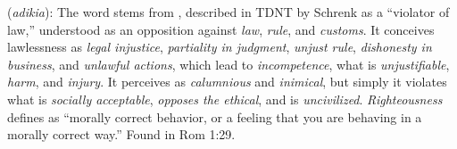 \item[Unrighteousness,]

(\textit{adikia}):
The word stems from , described in TDNT by Schrenk as a ``violator of law,'' understood as an opposition against \emph{law}, \emph{rule}, and \emph{customs}. It conceives lawlessness as \emph{legal injustice}, \emph{partiality in judgment}, \emph{unjust rule}, \emph{dishonesty in business}, and \emph{unlawful actions}, which lead to \emph{incompetence}, what is \emph{unjustifiable}, \emph{harm}, and \emph{injury}. It perceives as \emph{calumnious} and \emph{inimical}, but simply it violates what is \emph{socially acceptable}, \emph{opposes the ethical}, and is \emph{uncivilized}. \emph{Righteousness} defines as ``morally correct behavior, or a feeling that you are behaving in a morally correct way.''
Found in Rom 1:29.
